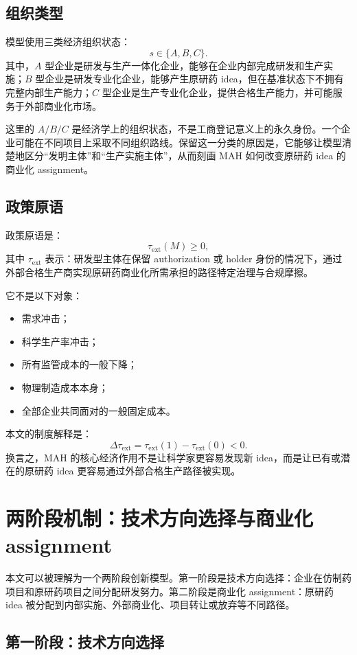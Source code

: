 \documentclass[12pt]{article}
\newcommand{\tauext}{\tau_{\mathrm{ext}}}
\begin{document}
\subsection{组织类型}

模型使用三类经济组织状态：
\[
s\in\{A,B,C\}.
\]
其中，$A$ 型企业是研发与生产一体化企业，能够在企业内部完成研发和生产实施；$B$ 型企业是研发专业化企业，能够产生原研药 idea，但在基准状态下不拥有完整内部生产能力；$C$ 型企业是生产专业化企业，提供合格生产能力，并可能服务于外部商业化市场。

这里的 $A/B/C$ 是经济学上的组织状态，不是工商登记意义上的永久身份。一个企业可能在不同项目上采取不同组织路线。保留这一分类的原因是，它能够让模型清楚地区分“发明主体”和“生产实施主体”，从而刻画 MAH 如何改变原研药 idea 的商业化 assignment。

\subsection{政策原语}

政策原语是：
\[
\tauext(M)\geq 0,
\]
其中 $\tauext$ 表示：研发型主体在保留 authorization 或 holder 身份的情况下，通过外部合格生产商实现原研药商业化所需承担的路径特定治理与合规摩擦。

它不是以下对象：
\begin{itemize}
    \item 需求冲击；
    \item 科学生产率冲击；
    \item 所有监管成本的一般下降；
    \item 物理制造成本本身；
    \item 全部企业共同面对的一般固定成本。
\end{itemize}
本文的制度解释是：
\[
\Delta \tauext = \tauext(1)-\tauext(0)<0.
\]
换言之，MAH 的核心经济作用不是让科学家更容易发现新 idea，而是让已有或潜在的原研药 idea 更容易通过外部合格生产路径被实现。

\section{两阶段机制：技术方向选择与商业化 assignment}

本文可以被理解为一个两阶段创新模型。第一阶段是技术方向选择：企业在仿制药项目和原研药项目之间分配研发努力。第二阶段是商业化 assignment：原研药 idea 被分配到内部实施、外部商业化、项目转让或放弃等不同路径。

\subsection{第一阶段：技术方向选择}
\end{document}
